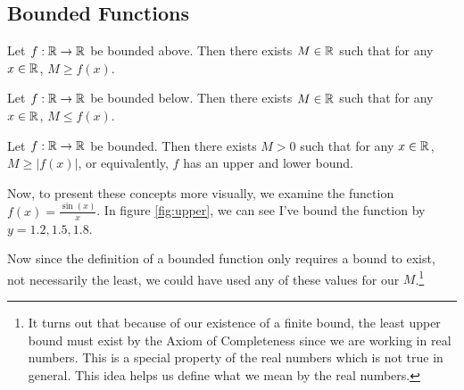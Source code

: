 \subsection{Bounded Functions}
\begin{define}
Let $f:\mathbb{R}\to\mathbb{R}$ be bounded above. Then there exists $M\in\mathbb{R}$ such that
for any $x\in\mathbb{R}$, $M\ge f(x)$.
\end{define}
\begin{define}
	Let $f:\mathbb{R}\to\mathbb{R}$ be bounded below. Then there exists $M\in\mathbb{R}$ such that for any $x\in\mathbb{R}$, $M\le f(x)$.
\end{define}
\begin{define}
	Let $f:\mathbb{R}\to\mathbb{R}$ be bounded. Then there exists $M>0$ such that for any $x\in\mathbb{R}$, $M\ge |f(x)|$, or equivalently, $f$ has an upper and lower bound.	
\end{define}
Now, to present these concepts more visually, we examine the function $f(x)=\frac{\sin(x)}{x}$. 
In figure \eqref{fig:upper}, we can see I've bound the function by $y=1.2,1.5,1.8$. 
\begin{figure}[h]
	\centering
	\caption{}
	\label{fig:upper}
\end{figure}
Now since the definition of a bounded function only requires a bound to exist, not necessarily the least, we could have used any of these values for our $M$.\footnote{
It turns out that because of our existence of a finite bound, the least upper bound must exist by the Axiom of Completeness since we are working in real numbers. This is a special property of the real numbers which is not true in general. This idea helps us define what we mean by the real numbers.}

